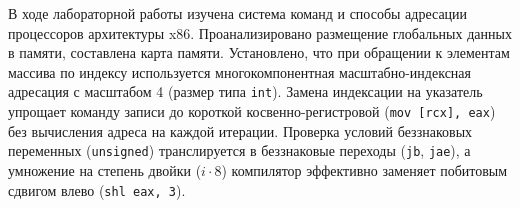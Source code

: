 \documentclass[14pt, a4paper]{extarticle}
\begin{document}
	В ходе лабораторной работы изучена система команд и способы адресации процессоров архитектуры x86. Проанализировано размещение глобальных данных в памяти, составлена карта памяти. Установлено, что при обращении к элементам массива по индексу используется многокомпонентная масштабно-индексная адресация с масштабом 4 (размер типа \texttt{int}). Замена индексации на указатель упрощает команду записи до короткой косвенно-регистровой (\texttt{mov [rcx], eax}) без вычисления адреса на каждой итерации. Проверка условий беззнаковых переменных (\texttt{unsigned}) транслируется в беззнаковые переходы (\texttt{jb}, \texttt{jae}), а умножение на степень двойки ($i \cdot 8$) компилятор эффективно заменяет побитовым сдвигом влево (\texttt{shl eax, 3}).








\end{document}
